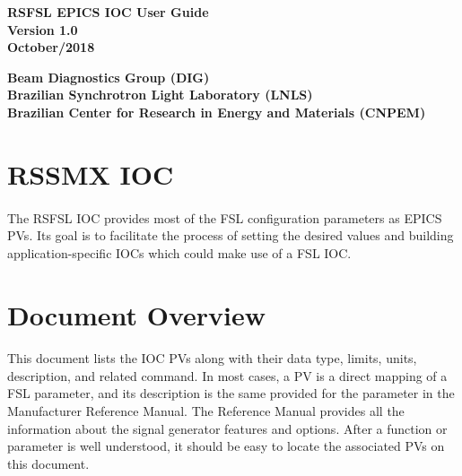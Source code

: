 \documentclass[openany]{article}
\begin{document}
\begin{titlepage}


\begin{center}

\vspace*{\fill}
\textbf{\Huge RSFSL EPICS IOC User Guide}\\[20pt]
\textbf{\Huge Version 1.0}\\[20pt]
\textbf{\Huge October/2018}
\vspace*{\fill}

\vfill
\textbf{Beam Diagnostics Group (DIG)}\\[5pt]
\textbf{Brazilian Synchrotron Light Laboratory (LNLS)}\\[5pt]
\textbf{Brazilian Center for Research in Energy and Materials (CNPEM)}
\end{center}

\end{titlepage}

\newpage
\pagestyle{plain} %

\tableofcontents

\newpage
\section{RSSMX IOC}

	\paragraph{} The RSFSL IOC provides most of the FSL configuration parameters as EPICS PVs. Its goal is to facilitate the process of setting the desired values and building application-specific IOCs which could make use of a FSL IOC.

\section{Document Overview}

	\paragraph{} This document lists the IOC PVs along with their data type, limits, units, description, and related command. In most cases, a PV is a direct mapping of a FSL parameter, and its description is the same provided for the parameter in the Manufacturer Reference Manual. The Reference Manual provides all the information about the signal generator features and options. After a function or parameter is well understood, it should be easy to locate the associated PVs on this document.
\end{document}
